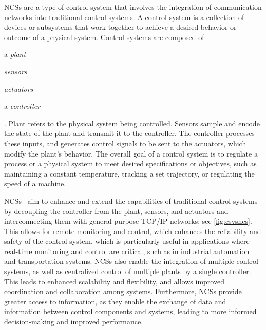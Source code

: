 \glspl{NCS} are a type of control system that involves the integration of communication networks into traditional control systems.
A control system is a collection of devices or subsystems that work together to achieve a desired behavior or outcome of a physical system.
Control systems are composed of
\begin{inlineenum}
    \item a \emph{plant}
    \item \emph{sensors}
    \item \emph{actuators}
    \item a \emph{controller}
\end{inlineenum}.
Plant refers to the physical system being controlled.
Sensors sample and encode the state of the plant and transmit it to the controller.
The controller processes these inputs, and generates control signals to be sent to the actuators, which modify the plant's behavior.
The overall goal of a control system is to regulate a process or a physical system to meet desired specifications or objectives, such as maintaining a constant temperature, tracking a set trajectory, or regulating the speed of a machine.

\glspl{NCS}~\cite{gupta2010networked} aim to enhance and extend the capabilities of traditional control systems by decoupling the controller from the plant, sensors, and actuators and interconnecting them with general-purpose \acs{TCP}/\acs{IP} networks;
see \cref{fig:csvsncs}.
This allows for remote monitoring and control, which enhances the reliability and safety of the control system, which is particularly useful in applications where real-time monitoring and control are critical, such as in industrial automation and transportation systems.
\glspl{NCS} also enable the integration of multiple control systems, as well as centralized control of multiple plants by a single controller.
This leads to enhanced scalability and flexibility, and allows improved coordination and collaboration among systems.
Furthermore, \glspl{NCS} provide greater access to information, as they enable the exchange of data and information between control components and systems, leading to more informed decision-making and improved performance.

